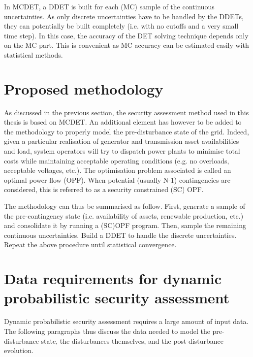 In MCDET, a DDET is built for each (MC) sample of the continuous uncertainties. As only discrete uncertainties have to be handled by the DDETs, they can potentially be built completely (i.e. with no cutoffs and a very small time step). In this case, the accuracy of the DET solving technique depends only on the MC part. This is convenient as MC accuracy can be estimated easily with statistical methods.


\section{Proposed methodology}
\label{sec:proposedMethodology}

As discussed in the previous section, the security assessment method used in this thesis is based on MCDET. An additional element has however to be added to the methodology to properly model the pre-disturbance state of the grid. Indeed, given a particular realisation of generator and transmission asset availabilities and load, system operators will try to dispatch power plants to minimise total costs while maintaining acceptable operating conditions (e.g. no overloads, acceptable voltages, etc.). The optimisation problem associated is called an optimal power flow (OPF). When potential (usually N-1) contingencies are considered, this is referred to as a security constrained (SC) OPF.

The methodology can thus be summarised as follow. First, generate a sample of the pre-contingency state (i.e. availability of assets, renewable production, etc.) and consolidate it by running a (SC)OPF program. Then, sample the remaining continuous uncertainties. Build a DDET to handle the discrete uncertainties. Repeat the above procedure until statistical convergence.



\section{Data requirements for dynamic probabilistic security assessment}
\label{sec:DataRequirementsForDSA}

Dynamic probabilistic security assessment requires a large amount of input data. The following paragraphs thus discuss the data needed to model the pre-disturbance state, the disturbances themselves, and the post-disturbance evolution.

